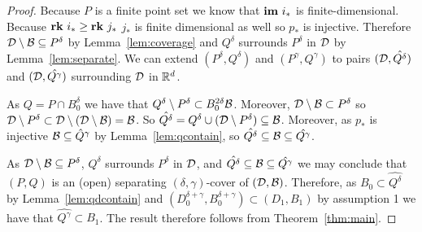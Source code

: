 \begin{proof}
  Because $P$ is a finite point set we know that $\mathbf{im}~i_*$ is finite-dimensional.
  Because $\mathbf{rk}~i_*\geq \mathbf{rk}~j_*$ $j_*$ is finite dimensional as well so $p_*$ is injective.
  Therefore ${\mathcal{D}}\setminus{\mathcal{B}}\subseteq P^\delta$ by Lemma~\ref{lem:coverage} and $Q^\delta$ surrounds $P^\delta$ in ${\mathcal{D}}$ by Lemma~\ref{lem:separate}.
  We can extend $(P^\delta, Q^\delta)$ and $(P^\gamma, Q^\gamma)$ to pairs $({\mathcal{D}}, \hat{Q^\delta})$ and $({\mathcal{D}}, \hat{Q^\gamma})$ surrounding ${\mathcal{D}}$ in $\mathbb{R}^d$.

  As $Q = P\cap B_0^\delta$ we have that $Q^\delta\setminus P^\delta\subset B_0^{2\delta} {\mathcal{B}}$.
  Moreover, ${\mathcal{D}}\setminus{\mathcal{B}}\subset P^\delta$ so ${\mathcal{D}}\setminus P^\delta \subset {\mathcal{D}}\setminus ({\mathcal{D}}\setminus{\mathcal{B}}) = {\mathcal{B}}$.
  So $\hat{Q^\delta} = Q^\delta\cup ({\mathcal{D}}\setminus P^\delta)\subseteq {\mathcal{B}}$.
  Moreover, as $p_*$ is injective ${\mathcal{B}}\subseteq \hat{Q}^\gamma$ by Lemma~\ref{lem:qcontain}, so $\hat{Q^\delta}\subseteq {\mathcal{B}}\subseteq \hat{Q^\gamma}$.

  As ${\mathcal{D}}\setminus {\mathcal{B}} \subseteq P^\delta$, $Q^\delta$ surrounds $P^\delta$ in ${\mathcal{D}}$, and $\hat{Q^\delta}\subseteq {\mathcal{B}}\subseteq \hat{Q^\gamma}$ we may conclude that $(P, Q)$ is an (open) separating $(\delta,\gamma)$-cover of $({\mathcal{D}}, {\mathcal{B}})$.
  Therefore, as $B_0\subset \hat{Q^\delta}$ by Lemma~\ref{lem:qdcontain} and $(D_0^{\delta+\gamma}, B_0^{\delta+\gamma})\subset (D_1, B_1)$ by assumption 1 we have that $\hat{Q^\gamma}\subset B_1$.
  The result therefore follows from Theorem~\ref{thm:main}.


\end{proof}
